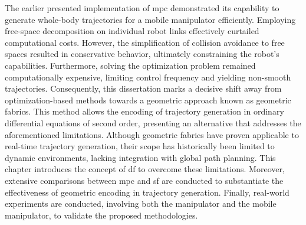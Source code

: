 The earlier presented implementation of \acl{mpc} demonstrated its capability to
generate whole-body trajectories for a mobile manipulator efficiently. Employing
free-space decomposition on individual robot links effectively curtailed
computational costs. However, the simplification of collision avoidance to free
spaces resulted in conservative behavior, ultimately constraining the robot's
capabilities. Furthermore, solving the optimization problem remained
computationally expensive, limiting control frequency and yielding non-smooth
trajectories. Consequently, this dissertation marks a decisive shift away from
optimization-based methods towards a geometric approach known as geometric
fabrics. This method allows the encoding of trajectory generation in ordinary
differential equations of second order, presenting an alternative that addresses
the aforementioned limitations. Although geometric fabrics have proven
applicable to real-time trajectory generation, their scope has historically been
limited to dynamic environments, lacking integration with global path planning.
This chapter introduces the concept of \acl{df} to overcome these limitations.
Moreover, extensive comparisons between \ac{mpc} and \acl{sf} are conducted to
substantiate the effectiveness of geometric encoding in trajectory generation.
Finally, real-world experiments are conducted, involving both the manipulator
and the mobile manipulator, to validate the proposed methodologies.
